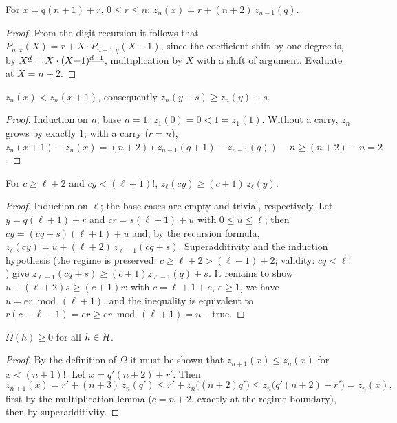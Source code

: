 \begin{lemma}
For $x=q(n{+}1)+r$, $0\le r\le n$:
$z_n(x)=r+(n{+}2)\,z_{n-1}(q)$.
\end{lemma}

\begin{proof}
From the digit recursion it follows that
$P_{n,x}(X)=r+X\cdot P_{n-1,q}(X{-}1)$, since the coefficient
shift by one degree is, by
$X^{\underline{d}}=X\cdot(X{-}1)^{\underline{d-1}}$, multiplication by $X$ with a
shift of argument. Evaluate at $X=n{+}2$.
\end{proof}

\begin{lemma}
$z_n(x)<z_n(x{+}1)$, consequently $z_n(y{+}s)\ge z_n(y)+s$.
\end{lemma}

\begin{proof}
Induction on $n$; base $n=1$: $z_1(0)=0<1=z_1(1)$. Without a
carry, $z_n$ grows by exactly 1; with a
carry ($r=n$),
$z_n(x{+}1)-z_n(x)=(n{+}2)(z_{n-1}(q{+}1)-z_{n-1}(q))-n
\ge(n{+}2)-n=2$.
\end{proof}

\begin{lemma}
For $c\ge\ell{+}2$ and $cy<(\ell{+}1)!$,
$z_\ell(cy)\ge(c{+}1)\,z_\ell(y)$.
\end{lemma}

\begin{proof}
Induction on $\ell$; the base cases are empty and trivial,
respectively. Let
$y=q(\ell{+}1)+r$ and $cr=s(\ell{+}1)+u$ with $0\le u\le\ell$;
then $cy=(cq{+}s)(\ell{+}1)+u$ and, by the recursion formula,
$z_\ell(cy)=u+(\ell{+}2)\,z_{\ell-1}(cq{+}s)$. Superadditivity
and the induction hypothesis (the regime is preserved:
$c\ge\ell{+}2>(\ell{-}1){+}2$; validity: $cq<\ell!$) give
$z_{\ell-1}(cq{+}s)\ge(c{+}1)z_{\ell-1}(q)+s$. It remains to show
$u+(\ell{+}2)s\ge(c{+}1)r$: with $c=\ell{+}1{+}e$, $e\ge1$, we
have $u=er\bmod(\ell{+}1)$, and the inequality is equivalent to
$r(c{-}\ell{-}1)=er\ge er\bmod(\ell{+}1)=u$ -- true.
\end{proof}

\begin{satz}
$\Omega(h)\ge0$ for all $h\in\mathcal H$.
\end{satz}

\begin{proof}
By the definition of $\Omega$ it must be shown that
$z_{n+1}(x)\le z_n(x)$ for $x<(n{+}1)!$. Let
$x=q'(n{+}2)+r'$. Then
\[
z_{n+1}(x)=r'+(n{+}3)\,z_n(q')
\le r'+z_n\bigl((n{+}2)q'\bigr)
\le z_n\bigl(q'(n{+}2)+r'\bigr)=z_n(x),
\]
first by the multiplication lemma ($c=n{+}2$, exactly at the
regime boundary), then by superadditivity.
\end{proof}

